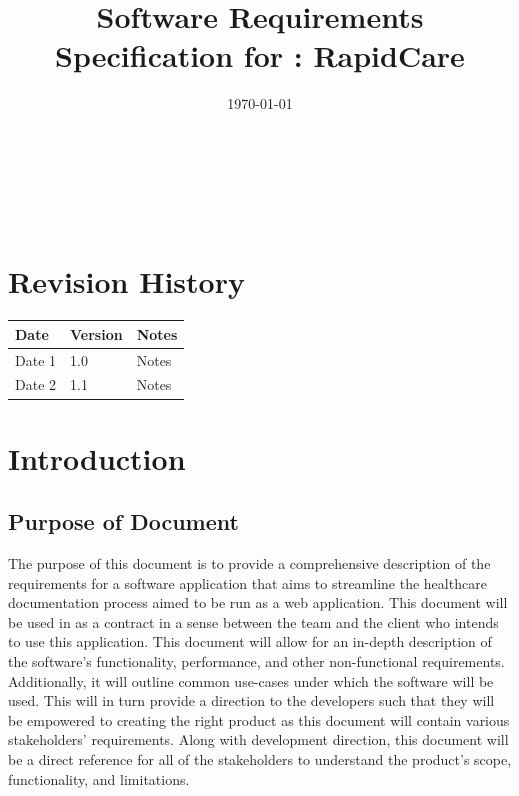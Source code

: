 \documentclass[12pt]{article}
\begin{document}
\title{Software Requirements Specification for \progname: RapidCare}
\author{\authname}
\date{\today}
	
\maketitle

~\newpage


\tableofcontents

~\newpage

\section*{Revision History}

\begin{tabularx}{\textwidth}{p{3cm}p{2cm}X}
\toprule {\bf Date} & {\bf Version} & {\bf Notes}\\
\midrule
Date 1 & 1.0 & Notes\\
Date 2 & 1.1 & Notes\\
\bottomrule
\end{tabularx}

\newpage



\section{Introduction}

\subsection{Purpose of Document} \label{sec_PurposeOfDocument}

  The purpose of this document is to provide a comprehensive description of the requirements for a software application that aims to streamline the healthcare documentation process aimed to be run as a web application. This document will be used in as a contract in a sense between the team and the client who intends to use this application. This document will allow for an in-depth description of the software's functionality, performance, and other non-functional requirements. Additionally, it will outline common use-cases under which the software will be used. This will in turn provide a direction to the developers such that they will be empowered to creating the right product as this document will contain various stakeholders' requirements. Along with development direction, this document will be a direct reference for all of the stakeholders to understand the product's scope, functionality, and limitations.
\end{document}
